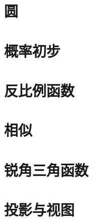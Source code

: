 \documentclass[lang=cn, 10pt, titlestyle=hang, oneside]{elegantbook}
\begin{document}
\chapter{圆}

\chapter{概率初步}

\chapter{反比例函数}

\chapter{相似}

\chapter{锐角三角函数}

\chapter{投影与视图}
\end{document}
